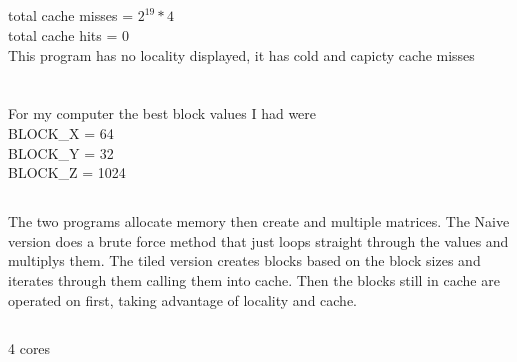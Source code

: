 \documentclass{article}
\begin{document}
\subsection{}
total cache misses = $2^{19}*4$\\
total cache hits = $0$\\
This program has no locality displayed, it has cold and capicty cache misses

\section{}

\subsection{}
For my computer the best block values I had were\\
BLOCK\_X = 64\\
BLOCK\_Y = 32\\
BLOCK\_Z = 1024\\

\subsection{}
The two programs allocate memory then create and multiple matrices. The Naive version does a brute force method that just loops straight through the values and multiplys them. The tiled version creates blocks based on the block sizes and iterates through them calling them into cache. Then the blocks still in cache are operated on first, taking advantage of locality and cache.


\subsection{}

4 cores 
\end{document}

